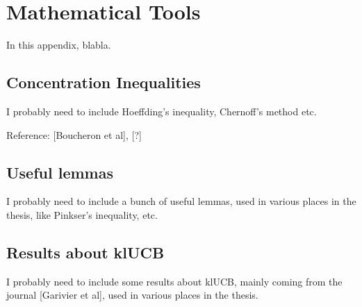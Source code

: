 \chapter{Mathematical Tools}
\label{app:1:mathsTools}

In this appendix, blabla.

\section{Concentration Inequalities}
\label{sec:app1:ConcentrationInequalities}

I probably need to include Hoeffding's inequality, Chernoff's method etc.

Reference: [Boucheron et al], [?]


\section{Useful lemmas}
\label{sec:app1:UsefulLemmas}

I probably need to include a bunch of useful lemmas, used in various places in the thesis, like Pinkser's inequality, etc.


\section{Results about klUCB}
\label{sec:app1:resultsklUCB}

I probably need to include some results about klUCB, mainly coming from the journal [Garivier et al], used in various places in the thesis.


